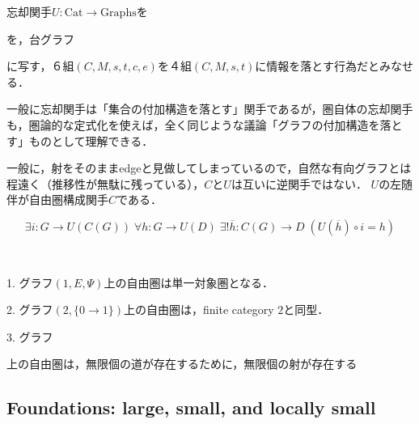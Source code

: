 \documentclass[uplatex, 12pt, dvipdfmx]{jsarticle}
\begin{document}
\begin{definition*}[圏の忘却関手]
    忘却関手$U:\mathrm{Cat}\to \mathrm{Graphs}$を
    \begin{center}\end{center}
    を，台グラフ
    \begin{center}\end{center}
    に写す，６組$(C,M,s,t,c,e)$を４組$(C,M,s,t)$に情報を落とす行為だとみなせる．
\end{definition*}
\begin{remark*}
    一般に忘却関手は「集合の付加構造を落とす」関手であるが，圏自体の忘却関手も，圏論的な定式化を使えば，全く同じような議論「グラフの付加構造を落とす」ものとして理解できる．

    一般に，射をそのままedgeと見做してしまっているので，自然な有向グラフとは程遠く（推移性が無駄に残っている），$C$と$U$は互いに逆関手ではない．
    $U$の左随伴が自由圏構成関手$C$である．
\end{remark*}

\begin{definition*}[自由圏の普遍性]
    \[ \exists i:G\to U(C(G))\; \forall h:G\to U(D) \; \exists !\overline{h}:C(G)\to D\; (U(\overline{h})\circ i=h) \]
\end{definition*}
\begin{example*}　

    1. グラフ$(1, E, \Psi)$上の自由圏は単一対象圏となる．

    2. グラフ$(2, \{0\to 1\})$上の自由圏は，finite category $2$と同型．

    3. グラフ\begin{center}
    \end{center}上の自由圏は，無限個の道が存在するために，無限個の射が存在する
\end{example*}

\subsection{Foundations: large, small, and locally small}
\end{document}
